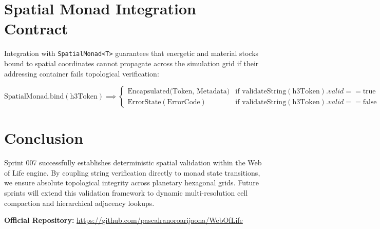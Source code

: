 \documentclass[11pt, a4paper]{article}
\begin{document}
\section{Spatial Monad Integration Contract}
Integration with \texttt{SpatialMonad<T>} guarantees that energetic and material stocks bound to spatial coordinates cannot propagate across the simulation grid if their addressing container fails topological verification:

\begin{equation}
\text{SpatialMonad.bind}(\text{h3Token}) \implies \begin{cases} 
\text{Encapsulated(Token, Metadata)} & \text{if } \text{validateString}(\text{h3Token}).valid == \text{true} \\ 
\text{ErrorState}(\text{ErrorCode}) & \text{if } \text{validateString}(\text{h3Token}).valid == \text{false} 
\end{cases}
\end{equation}

\section{Conclusion}
Sprint 007 successfully establishes deterministic spatial validation within the Web of Life engine. By coupling string verification directly to monad state transitions, we ensure absolute topological integrity across planetary hexagonal grids. Future sprints will extend this validation framework to dynamic multi-resolution cell compaction and hierarchical adjacency lookups.

\vspace{1em}
\noindent\textbf{Official Repository:} \url{https://github.com/pascalranoroarijaona/WebOfLife}
\end{document}
